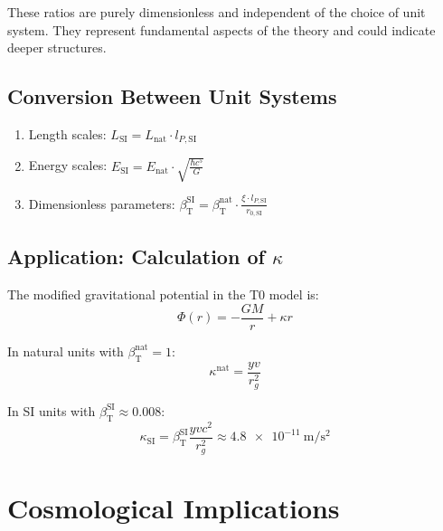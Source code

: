 \documentclass[12pt,a4paper]{article}
\newcommand{\betaT}{\beta_{\text{T}}}
\begin{document}
	These ratios are purely dimensionless and independent of the choice of unit system. They represent fundamental aspects of the theory and could indicate deeper structures.
	
	\subsection{Conversion Between Unit Systems}
	
	\begin{tcolorbox}[colback=blue!5!white, colframe=blue!75!black, title=Conversion Scheme]
		\begin{enumerate}
			\item Length scales: \(L_{\text{SI}} = L_{\text{nat}} \cdot l_{P,\text{SI}}\)
			\item Energy scales: \(E_{\text{SI}} = E_{\text{nat}} \cdot \sqrt{\frac{\hbar c^5}{G}}\)
			\item Dimensionless parameters: \(\betaT^{\text{SI}} = \betaT^{\text{nat}} \cdot \frac{\xi \cdot l_{P,\text{SI}}}{r_{0,\text{SI}}}\)
		\end{enumerate}
	\end{tcolorbox}
	
	\subsection{Application: Calculation of \(\kappa\)}
	
	The modified gravitational potential in the T0 model is:
	\begin{equation}
		\Phi(r) = -\frac{G M}{r} + \kappa r
	\end{equation}
	
	
	
	In natural units with \(\betaT^{\text{nat}} = 1\):
	\begin{equation}
		\kappa^{\text{nat}} = \frac{y v}{r_g^2}
	\end{equation}
	
	In SI units with \(\betaT^{\text{SI}} \approx 0.008\):
	\begin{equation}
		\kappa_{\text{SI}} = \betaT^{\text{SI}} \frac{y v c^2}{r_g^2} \approx \SI{4.8e-11}{\meter\per\second\squared}
	\end{equation}
	
	\section{Cosmological Implications}
	
\end{document}
